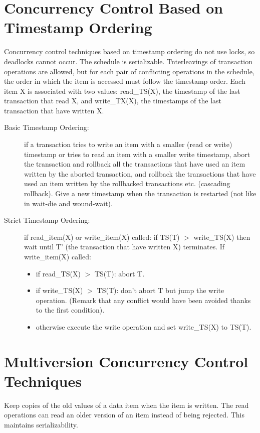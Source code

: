 \section{Concurrency Control Based on Timestamp Ordering}
Concurrency control techniques based on timestamp ordering do not use locks, so deadlocks cannot occur. The schedule is serializable. Tnterleavings of transaction operations are allowed, but for each pair of conflicting operations in the schedule, the order in which the item is accessed must follow the timestamp order. Each item X is associated with two values: read\_TS(X), the timestamp of the last transaction that read X, and write\_TX(X), the timestamps of the last transaction that have written X.
\begin{description}
    \item[Basic Timestamp Ordering:] if a transaction tries to write an item with a smaller (read or write) timestamp or tries to read an item with a smaller write timestamp, abort the transaction and rollback all the transactions that have used an item written by the aborted transaction, and rollback the transactions that have used an item written by the rollbacked transactions etc. (cascading rollback). Give a new timestamp when the transaction is restarted (not like in wait-die and wound-wait).
    \item[Strict Timestamp Ordering:] if read\_item(X) or write\_item(X) called: if TS(T) $>$ write\_TS(X) then wait until T' (the transaction that have written X) terminates. If write\_item(X) called:
    \begin{itemize}
        \item if read\_TS(X) $>$ TS(T): abort T.
        \item if write\_TS(X) $>$ TS(T): don't abort T but jump the write operation. (Remark that any conflict would have been avoided thanks to the first condition). 
        \item otherwise execute the write operation and set write\_TS(X) to TS(T).
    \end{itemize} 
\end{description}

\section{Multiversion Concurrency Control Techniques}
Keep copies of the old values of a data item when the item is written. The read operations can read an older version of an item instead of being rejected. This maintains serializability.

